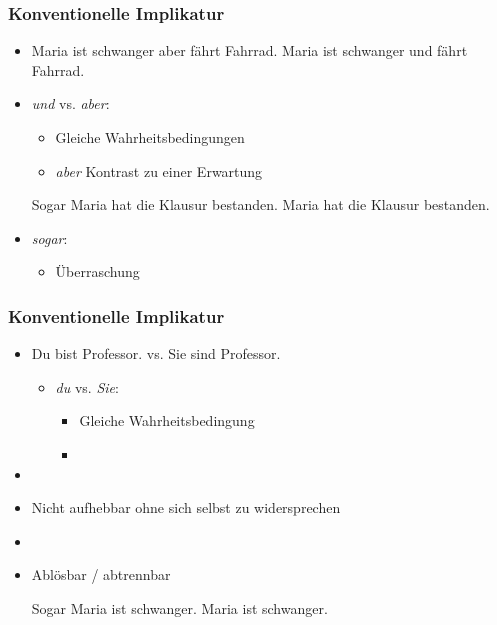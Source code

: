 
\begin{frame}
\frametitle{Konventionelle Implikatur}

\begin{itemize}
	\item[]

	\eal 
	\ex Maria ist schwanger aber fährt Fahrrad.
	\ex Maria ist schwanger und fährt Fahrrad.
	\zl
	
	\item \textit{und} vs. \textit{aber}:
		
	\begin{itemize}
		\item Gleiche Wahrheitsbedingungen
		\item \textit{aber} \ras Kontrast zu einer Erwartung
	\end{itemize}

\vspace{5mm}

	\eal 
	\ex Sogar Maria hat die Klausur bestanden.	
	\ex Maria hat die Klausur bestanden.
	\zl

	\item \textit{sogar}:
		
	\begin{itemize}
		\item Überraschung
	\end{itemize}
		
\end{itemize}

\end{frame}



\begin{frame}
\frametitle{Konventionelle Implikatur}

\begin{itemize}
	\item Du bist Professor. vs. Sie sind Professor.
	
	\begin{itemize}
		\item \textit{du} vs. \textit{Sie}:
		
		\begin{itemize}
			\item Gleiche Wahrheitsbedingung
			\item {}
		\end{itemize}
		
	\end{itemize}
	
	\item[]
	\item Nicht aufhebbar \ras ohne sich selbst zu widersprechen
	\item[]
	\item Ablösbar / abtrennbar
	
	\eal
	\ex Sogar Maria ist schwanger.
	\ex Maria ist schwanger.
	\zl
	
	\end{itemize}

\end{frame}


